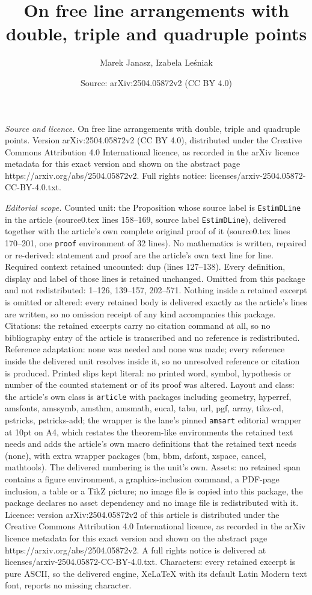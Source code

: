 \documentclass[10pt,a4paper]{amsart}
\title[On free line arrangements with double, triple and quadruple ]{On free line arrangements with double, triple and quadruple points}
\author{Marek Janasz, Izabela Le\'sniak}
\date{Source: arXiv:2504.05872v2 (CC BY 4.0)}
\begin{document}
\maketitle

\noindent\emph{Source and licence.} On free line arrangements with double, triple and quadruple points. Version arXiv:2504.05872v2 (CC BY 4.0), distributed under the Creative Commons Attribution 4.0 International licence, as recorded in the arXiv licence metadata for this exact version and shown on the abstract page https://arxiv.org/abs/2504.05872v2. Full rights notice: licenses/arxiv-2504.05872-CC-BY-4.0.txt.\par\smallskip

\noindent\textit{Editorial scope.} Counted unit: the Proposition whose source label is \texttt{EstimDLine} in the article (source0.tex lines 158--169, source label \texttt{EstimDLine}), delivered together with the article's own complete original proof of it (source0.tex lines 170--201, one \texttt{proof} environment of 32 lines). No mathematics is written, repaired or re-derived: statement and proof are the article's own text line for line. Required context retained uncounted: dup (lines 127--138). Every definition, display and label of those lines is retained unchanged. Omitted from this package and not redistributed: 1--126, 139--157, 202--571. Nothing inside a retained excerpt is omitted or altered: every retained body is delivered exactly as the article's lines are written, so no omission receipt of any kind accompanies this package. Citations: the retained excerpts carry no citation command at all, so no bibliography entry of the article is transcribed and no reference is redistributed. Reference adaptation: none was needed and none was made; every reference inside the delivered unit resolves inside it, so no unresolved reference or citation is produced. Printed slips kept literal: no printed word, symbol, hypothesis or number of the counted statement or of its proof was altered. Layout and class: the article's own class is \texttt{article} with packages including geometry, hyperref, amsfonts, amssymb, amsthm, amsmath, eucal, tabu, url, pgf, array, tikz-cd, pstricks, pstricks-add; the wrapper is the lane's pinned \texttt{amsart} editorial wrapper at 10pt on A4, which restates the theorem-like environments the retained text needs and adds the article's own macro definitions that the retained text needs (none), with extra wrapper packages (bm, bbm, dsfont, xspace, cancel, mathtools). The delivered numbering is the unit's own. Assets: no retained span contains a figure environment, a graphics-inclusion command, a PDF-page inclusion, a table or a TikZ picture; no image file is copied into this package, the package declares no asset dependency and no image file is redistributed with it. Licence: version arXiv:2504.05872v2 of this article is distributed under the Creative Commons Attribution 4.0 International licence, as recorded in the arXiv licence metadata for this exact version and shown on the abstract page https://arxiv.org/abs/2504.05872v2. A full rights notice is delivered at licenses/arxiv-2504.05872-CC-BY-4.0.txt. Characters: every retained excerpt is pure ASCII, so the delivered engine, XeLaTeX with its default Latin Modern text font, reports no missing character.
\end{document}
